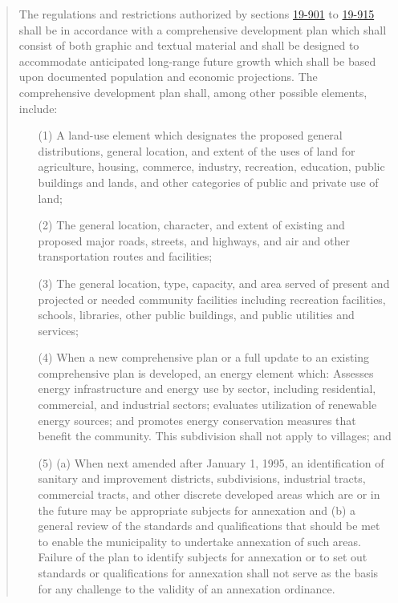 \begin{quote}
    The regulations and restrictions authorized by sections \href{https://nebraskalegislature.gov/laws/statutes.php?statute=19-901}{19-901} to \href{https://nebraskalegislature.gov/laws/statutes.php?statute=19-915}{19-915} shall be in accordance with a comprehensive development plan which shall consist of both graphic and textual material and shall be designed to accommodate anticipated long-range future growth which shall be based upon documented population and economic projections. The comprehensive development plan shall, among other possible elements, include:
    \begin{enumerate}
        \item [(1)] A land-use element which designates the proposed general distributions, general location, and extent of the uses of land for agriculture, housing, commerce, industry, recreation, education, public buildings and lands, and other categories of public and private use of land;
        \item [(2)] The general location, character, and extent of existing and proposed major roads, streets, and highways, and air and other transportation routes and facilities;
        \item [(3)] The general location, type, capacity, and area served of present and projected or needed community facilities including recreation facilities, schools, libraries, other public buildings, and public utilities and services;
        \item [(4)] When a new comprehensive plan or a full update to an existing comprehensive plan is developed, an energy element which: Assesses energy infrastructure and energy use by sector, including residential, commercial, and industrial sectors; evaluates utilization of renewable energy sources; and promotes energy conservation measures that benefit the community. This subdivision shall not apply to villages; and
        \item [(5)] (a) When next amended after January 1, 1995, an identification of sanitary and improvement districts, subdivisions, industrial tracts, commercial tracts, and other discrete developed areas which are or in the future may be appropriate subjects for annexation and (b) a general review of the standards and qualifications that should be met to enable the municipality to undertake annexation of such areas. Failure of the plan to identify subjects for annexation or to set out standards or qualifications for annexation shall not serve as the basis for any challenge to the validity of an annexation ordinance.
    \end{enumerate}
\end{quote}

